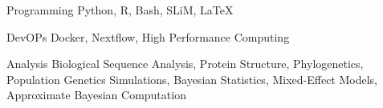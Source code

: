 

\begin{cvskills}

  \cvskill
    {Programming}
	{Python, R, Bash, SLiM, LaTeX}

  \cvskill
    {DevOPs}
	{Docker, Nextflow, High Performance Computing}

  \cvskill
    {Analysis}
	{Biological Sequence Analysis, Protein Structure, Phylogenetics, Population Genetics Simulations, \linebreak Bayesian Statistics, Mixed-Effect Models, Approximate Bayesian Computation}
	
\end{cvskills}